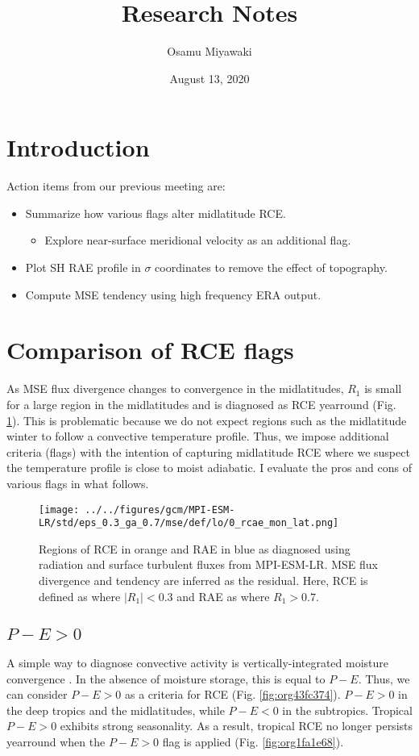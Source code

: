 \documentclass[11pt]{article}
\author{Osamu Miyawaki}
\date{August 13, 2020}
\title{Research Notes}
\begin{document}
\maketitle

\section{Introduction}
\label{sec:orgf4b5fd4}
Action items from our previous meeting are:
\begin{itemize}
\item Summarize how various flags alter midlatitude RCE.
\begin{itemize}
\item Explore near-surface meridional velocity as an additional flag.
\end{itemize}
\item Plot SH RAE profile in \(\sigma\) coordinates to remove the effect of topography.
\item Compute MSE tendency using high frequency ERA output.
\end{itemize}

\section{Comparison of RCE flags}
\label{sec:org202f2f8}
As MSE flux divergence changes to convergence in the midlatitudes, \(R_1\) is small for a large region in the midlatitudes and is diagnosed as RCE yearround (Fig. \ref{fig:org6bb4767}). This is problematic because we do not expect regions such as the midlatitude winter to follow a convective temperature profile. Thus, we impose additional criteria (flags) with the intention of capturing midlatitude RCE where we suspect the temperature profile is close to moist adiabatic. I evaluate the pros and cons of various flags in what follows.

\begin{figure}[htbp]
\centering
\texttt{[image: ../../figures/gcm/MPI-ESM-LR/std/eps\_0.3\_ga\_0.7/mse/def/lo/0\_rcae\_mon\_lat.png]}
\caption{\label{fig:org6bb4767}Regions of RCE in orange and RAE in blue as diagnosed using radiation and surface turbulent fluxes from MPI-ESM-LR. MSE flux divergence and tendency are inferred as the residual. Here, RCE is defined as where \(|R_1| < 0.3\) and RAE as where \(R_1 > 0.7\).}
\end{figure}

\clearpage
\subsection{\(P-E>0\)}
\label{sec:org54f98fe}
A simple way to diagnose convective activity is vertically-integrated moisture convergence \cite{neelin1987}. In the absence of moisture storage, this is equal to \(P-E\). Thus, we can consider \(P-E>0\) as a criteria for RCE (Fig. \ref{fig:org43fc374}). \(P-E>0\) in the deep tropics and the midlatitudes, while \(P-E<0\) in the subtropics. Tropical \(P-E>0\) exhibits strong seasonality. As a result, tropical RCE no longer persists yearround when the \(P-E>0\) flag is applied (Fig. \ref{fig:org1fa1e68}).
\end{document}
